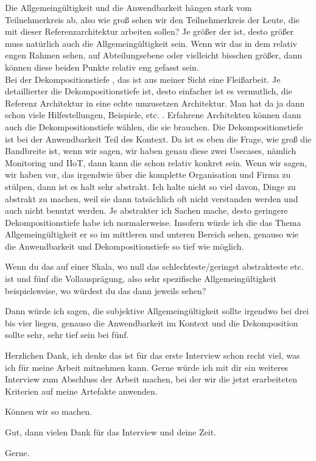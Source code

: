 \PA	 Die Allgemeingültigkeit und die Anwendbarkeit hängen stark vom Teilnehmerkreis ab, also wie groß sehen wir den Teilnehmerkreis der Leute, die mit dieser Referenzarchitektur arbeiten sollen? Je größer der ist, desto größer muss natürlich auch die Allgemeingültigkeit sein. Wenn wir das in dem relativ engen Rahmen sehen, auf Abteilungsebene oder vielleicht bisschen größer, dann können diese beiden Punkte relativ eng gefasst sein. \\
Bei der Dekompositionstiefe , das ist aus meiner Sicht eine Fleißarbeit. Je detaillierter die Dekompositionstiefe ist, desto einfacher ist es vermutlich, die Referenz Architektur in eine echte umzusetzen Architektur. Man hat da ja dann schon viele Hilfestellungen, Beispiele, etc. . Erfahrene Architekten können dann auch die Dekompositionstiefe wählen, die sie brauchen. Die Dekompositionstiefe ist bei der Anwendbarkeit Teil des Kontext. Da ist es eben die Frage, wie groß die Bandbreite ist, wenn wir sagen, wir haben genau diese zwei Usecases, nämlich Monitoring und \ac{IIoT}, dann kann die schon relativ konkret sein. Wenn wir sagen, wir haben vor, das irgendwie über die komplette Organisation und Firma zu stülpen, dann ist es halt sehr abstrakt. Ich halte nicht so viel davon, Dinge zu abstrakt zu machen, weil sie dann tatsächlich oft nicht verstanden werden und auch nicht benutzt werden. Je abstrakter ich Sachen mache, desto geringere Dekompositionstiefe habe ich normalerweise. Insofern würde ich die das Thema Allgemeingültigkeit er so im mittleren und unteren Bereich sehen, genauso wie die Anwendbarkeit und Dekompositionstiefe so tief wie möglich.

\LF	Wenn du das auf einer Skala, wo null das schlechteste/geringst abstrakteste etc. ist und fünf die Vollausprägung, also sehr spezifische Allgemeingültigkeit beispielsweise, wo würdest du das dann jeweils sehen?

\PA	 Dann würde ich sagen, die subjektive Allgemeingültigkeit sollte irgendwo bei drei bis vier liegen, genauso die Anwendbarkeit im Kontext und die Dekomposition sollte sehr, sehr tief sein bei fünf.

\LF	 Herzlichen Dank, ich denke das ist für das erste Interview schon recht viel, was ich für meine Arbeit mitnehmen kann. Gerne würde ich mit dir ein weiteres Interview zum Abschluss der Arbeit machen, bei der wir die jetzt erarbeiteten Kriterien auf meine Artefakte anwenden.

\PA	 Können wir so machen.

\LF	Gut, dann vielen Dank für das Interview und deine Zeit.

\PA	 Gerne.